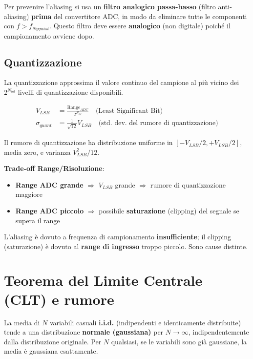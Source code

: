 \begin{attenzione}
Per prevenire l'aliasing si usa un \textbf{filtro analogico passa-basso} (filtro anti-aliasing) \textbf{prima} del convertitore ADC, in modo da eliminare tutte le componenti con $f > f_{Nyquist}$. Questo filtro deve essere \textbf{analogico} (non digitale) poiché il campionamento avviene dopo.
\end{attenzione}

\subsection{Quantizzazione}

La quantizzazione approssima il valore continuo del campione al più vicino dei $2^{N_{bit}}$ livelli di quantizzazione disponibili.

\begin{align}
V_{LSB} &= \frac{\text{Range}_{ADC}}{2^{N_{bit}}} \quad \text{(Least Significant Bit)} \\[4pt]
\sigma_{quant} &= \frac{1}{\sqrt{12}} V_{LSB} \quad \text{(std.\ dev.\ del rumore di quantizzazione)}
\end{align}

Il rumore di quantizzazione ha distribuzione uniforme in $[-V_{LSB}/2, +V_{LSB}/2]$, media zero, e varianza $V_{LSB}^2/12$.

\textbf{Trade-off Range/Risoluzione}:
\begin{itemize}
    \item \textbf{Range ADC grande} $\Rightarrow$ $V_{LSB}$ grande $\Rightarrow$ rumore di quantizzazione maggiore
    \item \textbf{Range ADC piccolo} $\Rightarrow$ possibile \textbf{saturazione} (clipping) del segnale se supera il range
\end{itemize}

\begin{attenzione}[]
L'aliasing è dovuto a frequenza di campionamento \textbf{insufficiente}; il clipping (saturazione) è dovuto al \textbf{range di ingresso} troppo piccolo. Sono cause distinte.
\end{attenzione}

\section{Teorema del Limite Centrale (CLT) e rumore}

\begin{definizione}[-- CLT]
La media di $N$ variabili casuali \textbf{i.i.d.} (indipendenti e identicamente distribuite) tende a una distribuzione \textbf{normale (gaussiana)} per $N \to \infty$, indipendentemente dalla distribuzione originale. Per $N$ qualsiasi, se le variabili sono già gaussiane, la media è gaussiana esattamente.
\end{definizione}

